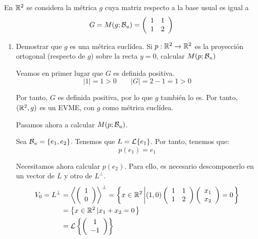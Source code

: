 \begin{ejercicio} En $\mathbb{R}^2$ se considera la métrica $g$ cuya matriz respecto a la base usual es igual a $$G=M(g; \mathcal{B}_u) = \left(\begin{array}{cc}
        1 & 1 \\
        1 & 2
    \end{array}\right)$$

\begin{enumerate}
    \item Demostrar que $g$ es una métrica euclídea. Si $p:\mathbb{R}^2\to \mathbb{R}^2$ es la proyección ortogonal (respecto de $g$) sobre la recta $y=0$, calcular $M(p; \mathcal{B}_u)$

    Veamos en primer lugar que $G$ es definida positiva.
    \begin{equation*}
        |1|=1>0 \qquad |G|=2-1=1 >0
    \end{equation*}

    Por tanto, $G$ es definida positiva, por lo que $g$ también lo es. Por tanto, $(\mathbb{R}^2, g)$ es un EVME, con $g$ como métrica euclídea.

    Pasamos ahora a calcular $M(p;\mathcal{B}_u)$.

    Sea $\mathcal{B}_u=\{e_1, e_2\}$. Tenemos que $L=\mathcal{L}\{e_1\}$. Por tanto, tenemos que:
        \begin{equation*}
            p(e_1)=e_1
        \end{equation*}

        Necesitamos ahora calcular $p(e_2)$. Para ello, es necesario descomponerlo en un vector de $L$ y otro de $L^\perp$.
        \begin{equation*}\begin{split}
            V_{0}=L^\perp &=\left<\left( \begin{array}{c}
           1 \\ 0
        \end{array}\right)\right>^\perp = \left\{x\in \mathbb{R}^2 \left|
            (1,0)\left(\begin{array}{cc}
                1 & 1 \\
                1 & 2
            \end{array}\right)
            \left( \begin{array}{c}
                x_1 \\ x_2
            \end{array}\right)
            = 0
            \right.\right\}\\
            & = \left\{x\in \mathbb{R}^2 \left|
            x_1+x_2=0
            \right.\right\}\\
            &= \mathcal{L} \left\{ \left(\begin{array}{c}
                     1 \\ -1
                \end{array} \right)\right\}
        \end{split}\end{equation*}


\end{enumerate}
\end{ejercicio}
